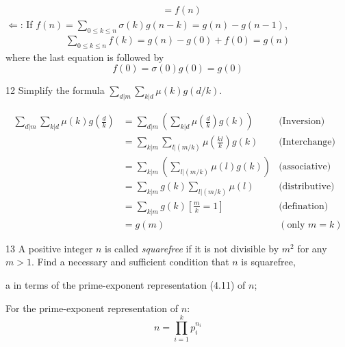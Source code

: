 \documentclass[a4paper,12pt]{article}
\makeatletter
\newtheorem*{solution}{Solution}
\theoremstyle{definition}
\renewenvironment{solution}[1][Solution] {\par\pushQED{\qed}\normalfont\topsep6\p@\@plus6\p@\relax\trivlist\item[\hskip\labelsep\bfseries#1\@addpunct{.}]\ignorespaces}{\popQED\endtrivlist\@endpefalse} \makeatother
\newenvironment{problems}{\begin{list}{}{\renewcommand{\makelabel}[1]{\textbf{##1}\hfil}}}{\end{list}}
\newenvironment{steps}{\begin{list}{}{\renewcommand{\makelabel}[1]{\textbf{##1}\hfil}}}{\end{list}}
\makeatother
\begin{document}
\begin{problems}
\begin{solution}
\begin{align*}
            &= f(n)
        \end{align*}
        $\Leftarrow$: If $f(n)=\sum_{0\leq k\leq n}\sigma (k)g(n-k)=g(n) - g(n-1)$,
        \begin{align*}
            \sum_{0\leq k\leq n}f(k) = g(n) - g(0) + f(0) = g(n)
        \end{align*}
        where the last equation is followed by 
        \begin{equation*}
            f(0) = \sigma(0)g(0) = g(0)
        \end{equation*}
    \end{solution}
    \item[12]Simplify the formula $\sum_{d | m}\sum_{k | d}\mu(k)g(d/k)$.
    \begin{solution}
        \begin{align*}
            \sum_{d | m}\sum_{k | d}\mu(k)g\left(\frac{d}{k}\right) &= \sum_{d | m}\left(\sum_{k | d} \mu\left(\frac{d}{k}\right)g(k)\right) & \text{(Inversion)}\\
            &= \sum_{k|m}\sum_{l|(m/k)} \mu\left(\frac{kl}{k}\right)g(k) & \text{(Interchange)}\\
            &= \sum_{k|m}\left(\sum_{l|(m/k)} \mu(l)g(k)\right) & \text{(associative)}\\
            &=\sum_{k|m}g(k)\sum_{l|(m/k)} \mu(l) & \text{(distributive)}\\
            &=\sum_{k|m}g(k)\left[\frac{m}{k}=1\right] & \text{(defination)}\\
            &=g(m) & (\text{only }m=k)
        \end{align*}
    \end{solution} 
    \item[13] A positive integer $n$ is called \emph{squarefree} if it is not divisible by $m^2$ for any $m > 1$. Find a necessary and sufficient condition that $n$ is squarefree,
    \begin{steps}
        \item[a]in terms of the prime-exponent representation (4.11) of $n$;
        \begin{solution}
            For the prime-exponent representation of $n$:
            \begin{equation*}
                n=\prod_{i=1}^k p_i^{n_i}
            \end{equation*}

\end{solution}
\end{steps}
\end{problems}
\end{document}
